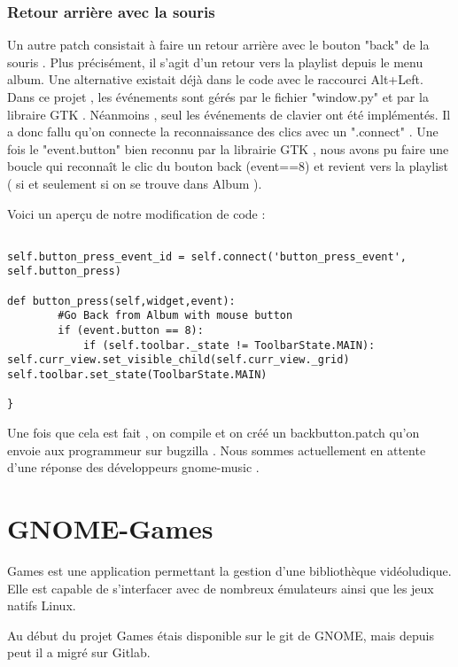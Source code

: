 \documentclass[12pt]{report}
\begin{document}
\subsection{Retour arrière avec la souris}
Un autre patch consistait à faire un retour arrière avec le bouton "back" de la souris . Plus précisément, il s'agit d'un retour vers la playlist depuis le menu album.
Une alternative existait déjà dans le code avec le raccourci Alt+Left. Dans ce projet , les événements sont gérés par le fichier "window.py" et par la libraire GTK . Néanmoins , seul les événements de clavier ont été implémentés. Il a donc fallu qu'on connecte la reconnaissance des clics avec un ".connect" . Une fois le "event.button" bien reconnu par la librairie GTK , nous avons pu faire une boucle qui reconnaît le clic du bouton back (event==8) et revient vers la playlist ( si et seulement si on se trouve dans Album ).

Voici un aperçu de notre modification de code : 

\begin{verbatim}

self.button_press_event_id = self.connect('button_press_event', self.button_press)

def button_press(self,widget,event):
        #Go Back from Album with mouse button 
     	if (event.button == 8):
         	if (self.toolbar._state != ToolbarState.MAIN):             				self.curr_view.set_visible_child(self.curr_view._grid)
self.toolbar.set_state(ToolbarState.MAIN)

}
\end{verbatim}

Une fois que cela est fait , on compile et on créé un backbutton.patch qu'on envoie aux programmeur sur bugzilla . 
Nous sommes actuellement en attente d'une réponse des développeurs gnome-music . 



\newpage
\chapter{GNOME-Games} %
Games est une application permettant la gestion d'une
bibliothèque vidéoludique. Elle est capable de s'interfacer avec de
nombreux émulateurs ainsi que les jeux natifs Linux.

Au début du projet Games étais disponible sur le git de GNOME, mais 
depuis peut il a migré sur Gitlab.
\end{document}

